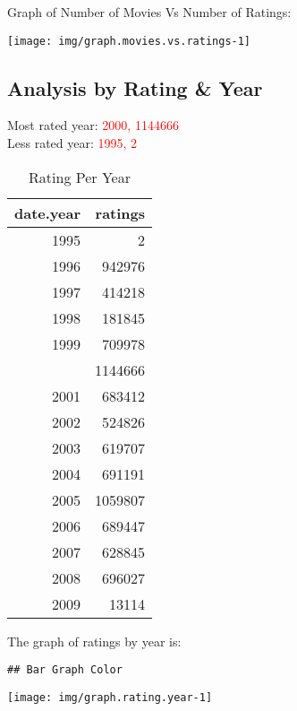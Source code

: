 \documentclass[]{article}
\begin{document}
Graph of Number of Movies Vs Number of Ratings:

\begin{center}\texttt{[image: img/graph.movies.vs.ratings-1]} \end{center}

\hypertarget{analysis-by-rating-year}{%
\subsection{Analysis by Rating \& Year}\label{analysis-by-rating-year}}

Most rated year: \textcolor{red}{2000, 1144666}\\
Less rated year: \textcolor{red}{1995, 2}

\begin{table}[!h]

\caption{\label{tab:table.rated.year}Rating Per Year}
\centering
\begin{tabular}{rr}
\toprule
date.year & ratings\\
\midrule
\rowcolor{gray!6}  1995 & 2\\
1996 & 942976\\
\rowcolor{gray!6}  1997 & 414218\\
1998 & 181845\\
\rowcolor{gray!6}  1999 & 709978\\
\addlinespace
2000 & 1144666\\
\rowcolor{gray!6}  2001 & 683412\\
2002 & 524826\\
\rowcolor{gray!6}  2003 & 619707\\
2004 & 691191\\
\addlinespace
\rowcolor{gray!6}  2005 & 1059807\\
2006 & 689447\\
\rowcolor{gray!6}  2007 & 628845\\
2008 & 696027\\
\rowcolor{gray!6}  2009 & 13114\\
\bottomrule
\end{tabular}
\end{table}

The graph of ratings by year is:

\begin{verbatim}
## Bar Graph Color
\end{verbatim}

\begin{center}\texttt{[image: img/graph.rating.year-1]} \end{center}
\end{document}

